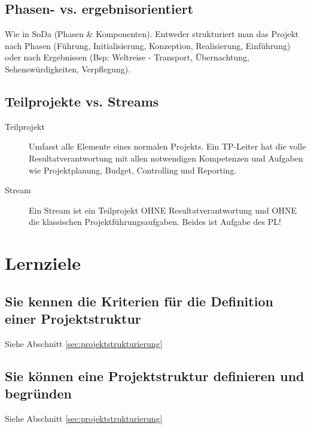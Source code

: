 \subsection{Phasen- vs. ergebnisorientiert}
Wie in SoDa (Phasen \& Komponenten). Entweder strukturiert man das Projekt nach Phasen (Führung, Initialisierung, Konzeption, Realisierung, Einführung) oder nach Ergebnissen (Bsp: Weltreise - Transport, Übernachtung, Sehenswürdigkeiten, Verpflegung).

\subsection{Teilprojekte vs. Streams}
\begin{description}
	\item[Teilprojekt] Umfasst alle Elemente eines normalen Projekts. Ein TP-Leiter hat die volle Resultatverantwortung mit allen notwendigen Kompetenzen und Aufgaben wie Projektplanung, Budget, Controlling und Reporting.
	\item[Stream] Ein Stream ist ein Teilprojekt OHNE Resultatverantwortung und OHNE die klassischen Projektführungsaufgaben. Beides ist Aufgabe des PL!
\end{description}

\section{Lernziele}
\subsection{Sie kennen die Kriterien für die Definition einer Projektstruktur}
Siehe Abschnitt \ref{sec:projektstrukturierung}

\subsection{Sie können eine Projektstruktur definieren und begründen}
Siehe Abschnitt \ref{sec:projektstrukturierung}